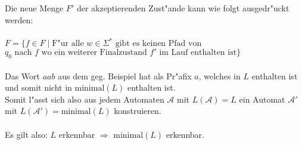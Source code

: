 \documentclass[a4paper,12pt]{article}
\begin{document}
    Die neue Menge $ F' $ der akzeptierenden Zust"ande kann wie folgt ausgedr"uckt werden: \\ \\
    $ F = \{f \in F \; | \; \text{F"ur alle } w \in \Sigma^* \text{ gibt es keinen Pfad von } $ \\
            $ q_0 \text{ nach } f \text{ wo ein weiterer Finalzustand } f' \text{ im Lauf enthalten ist} \} $ \\ \\

    Das Wort $ aab $ aus dem geg. Beispiel hat als Pr"afix $ a $, welches in $ L $ enthalten ist und somit nicht
    in $ \text{minimal}(L) $ enthalten ist. \\
    Somit l"asst sich also aus jedem Automaten $ \mathcal{A} $ mit $ L(\mathcal{A}) = L $ ein Automat $ \mathcal{A}' $
    mit $ L(\mathcal{A}') = \text{minimal}(L) $ konstruieren. \\ \\
    Es gilt also: $ L $ erkennbar $ \Rightarrow $ $ \text{minimal}(L) $ erkennbar.
\end{document}

